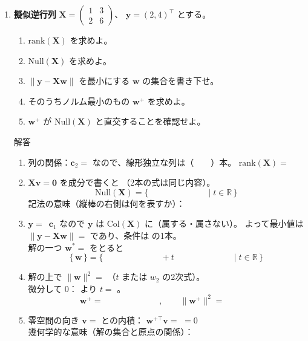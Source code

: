 \documentclass[a4paper,dvipdfmx]{jsarticle}
\newcommand{\提出期限}{2026年10月19日（月）}
\newcommand{\学籍番号}{0000000}
\newcommand{\氏名}{氏名を書く}
\newcommand{\提出日}{2026年10月19日}
\newenvironment{answer}{\begin{itembox}[l]{解答}}{\end{itembox}}
\begin{document}
\begin{enumerate}
  \item \textbf{擬似逆行列}\quad
    $\bm{X} = \begin{pmatrix} 1 & 3 \\ 2 & 6 \end{pmatrix}$、
    $\bm{y} = (2, 4)^\top$ とする。
    \begin{enumerate}
      \item $\mathrm{rank}(\bm{X})$ を求めよ。
      \item $\mathrm{Null}(\bm{X})$ を求めよ。
      \item $\|\bm{y} - \bm{X}\bm{w}\|$ を最小にする $\bm{w}$ の集合を書き下せ。
      \item そのうちノルム最小のもの $\bm{w}^{+}$ を求めよ。
      \item $\bm{w}^{+}$ が $\mathrm{Null}(\bm{X})$ と直交することを確認せよ。
    \end{enumerate}
    \begin{answer}
      \begin{enumerate}
        \item 列の関係：$\bm{c}_2 = $ \phantom{XXXX} なので、線形独立な列は（　　）本。
          $\mathrm{rank}(\bm{X}) = $ \phantom{XX}
        \item $\bm{X}\bm{v} = \bm{0}$ を成分で書くと \phantom{XXXXXXXXXXXX}（2本の式は同じ内容）。\\
          \begin{equation*}
            \mathrm{Null}(\bm{X}) = \{\, \phantom{XXXXXXXX} \mid t \in \mathbb{R} \,\}
          \end{equation*}
          記法の意味（縦棒の右側は何を表すか）：
        \item $\bm{y} = $ \phantom{XX}$\,\bm{c}_1$ なので $\bm{y}$ は $\mathrm{Col}(\bm{X})$ に（属する・属さない）。
          よって最小値は $\|\bm{y} - \bm{X}\bm{w}\| = $ \phantom{XX} であり、条件は \phantom{XXXXXXXXXX} の1本。\\
          解の一つ $\bm{w}^* = $ \phantom{XXXXXX} をとると
          \begin{equation*}
            \{\, \bm{w} \,\} = \{\, \phantom{XXXXXXXX} + t\,\phantom{XXXXXXXX} \mid t \in \mathbb{R} \,\}
          \end{equation*}
        \item 解の上で $\|\bm{w}\|^2 = $ \phantom{XXXXXXXXXXXXXXXX}（$t$ または $w_2$ の2次式）。\\
          微分して $0$：\phantom{XXXXXXXXXXXX} より $t = $ \phantom{XXX}。
          \begin{equation*}
            \bm{w}^{+} = \phantom{XXXXXXXX}, \qquad \|\bm{w}^{+}\|^2 = \phantom{XXXX}
          \end{equation*}
        \item 零空間の向き $\bm{v} = $ \phantom{XXXXXX} との内積：
          $\bm{w}^{+\top}\bm{v} = $ \phantom{XXXXXXXXXXXX} $= 0$ \\
          幾何学的な意味（解の集合と原点の関係）：
      \end{enumerate}
    \end{answer}


\end{enumerate}
\end{document}
